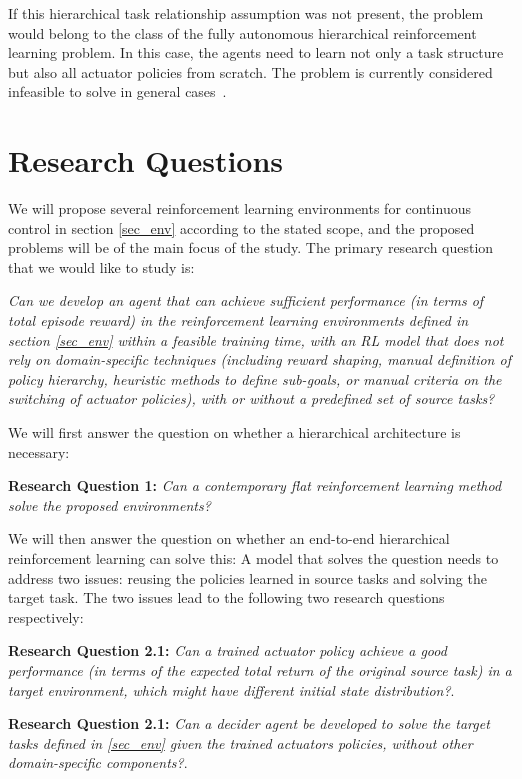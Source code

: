 If this hierarchical task relationship assumption was not present, the problem would belong to the class of the fully autonomous hierarchical reinforcement learning problem. In this case, the agents need to learn not only a task structure but also all actuator policies from scratch. The problem is currently considered infeasible to solve in general cases~\cite{barto2003recent}.


\section{Research Questions}


We will propose several reinforcement learning environments for continuous control in section \ref{sec_env} according to the stated scope, and the proposed problems will be of the main focus of the study.
The primary research question that we would like to study is:

    \textit{Can we develop an agent that can achieve sufficient performance (in terms of total episode reward) in the reinforcement learning environments defined in section \ref{sec_env} within a feasible training time, with an RL model that does not rely on domain-specific techniques  (including reward shaping, manual definition of policy hierarchy, heuristic methods to define sub-goals, or manual criteria on the switching of actuator policies), with or without a predefined set of source tasks?}


We will first answer the question on whether a hierarchical architecture is necessary: 

\textbf{Research Question 1: }\textit{Can a contemporary flat reinforcement learning method solve the proposed environments?}


We will then answer the question on whether an end-to-end hierarchical reinforcement learning can solve this:
A model that solves the question needs to address two issues: reusing the policies learned in source tasks and solving the target task. The two issues lead to the following two research questions respectively:

\textbf{Research Question 2.1: }\textit{Can a trained actuator policy achieve a good performance (in terms of the expected total return of the original source task) in a target environment, which might have different initial state distribution?}.

\textbf{Research Question 2.1: }\textit{Can a decider agent be developed to solve the target tasks defined in \ref{sec_env} given the trained actuators policies, without other domain-specific components?}.
